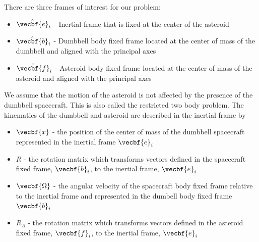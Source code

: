 \documentclass[11pt, reqno]{article}    %
\begin{document}
There are three frames of interest for our problem:
\begin{itemize}
    \item \( \hat{\vecbf{e}}_i \) - Inertial frame that is fixed at the center of the asteroid
    \item \( \hat{\vecbf{b}}_i \) - Dumbbell body fixed frame located at the center of mass of the dumbbell and aligned with the principal axes
    \item \( \hat{\vecbf{f}}_i \) - Asteroid body fixed frame located at the center of mass of the asteroid and aligned with the principal axes
\end{itemize}
We assume that the motion of the asteroid is not affected by the presence of the dumbbell spacecraft.
This is also called the restricted two body problem.
The kinematics of the dumbbell and asteroid are described in the inertial frame by
\begin{itemize}
    \item \( \vecbf{x} \) - the position of the center of mass of the dumbbell spacecraft represented in the inertial frame \( \vecbf{e}_i\)
    \item \( R \) - the rotation matrix which transforms vectors defined in the spacecraft fixed frame, \( \vecbf{b}_i \), to the inertial frame, \( \vecbf{e}_i \)
    \item \( \vecbf{\Omega} \) - the angular velocity of the spacecraft body fixed frame relative to the inertial frame and represented in the dumbell body fixed frame \( \vecbf{b}_i \)
    \item \( R_A \) - the rotation matrix which transforms vectors defined in the asteroid fixed frame, \( \vecbf{f}_i \), to the inertial frame, \( \vecbf{e}_i \)
\end{itemize}
\end{document}

